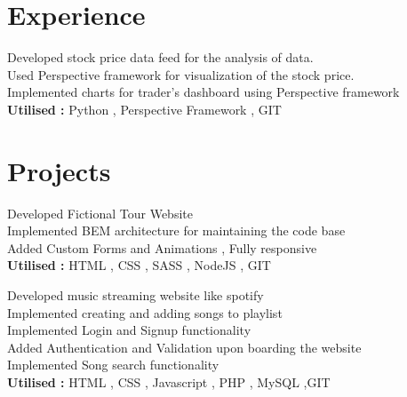 \documentclass[]{deedy-resume-openfont}
\begin{document}
\begin{minipage}[t]{0.66\textwidth} 

\section{Experience}

\textbullet{} Developed stock price data feed for the analysis of data.\\ 
\textbullet Used Perspective framework for visualization of the stock price.\\
\textbullet Implemented charts for trader's dashboard using Perspective framework\\
\textbf{Utilised : } Python , Perspective Framework , GIT 
\sectionsep




\section{Projects}
\textbullet{} Developed Fictional Tour Website  \\
\textbullet{} Implemented BEM architecture for maintaining the code base \\
\textbullet{} Added Custom Forms and Animations , Fully responsive \\
\textbf{Utilised : } HTML , CSS , SASS , NodeJS , GIT
\sectionsep

\textbullet Developed music streaming website like spotify \\
\textbullet Implemented creating and adding songs to playlist\\
\textbullet{} Implemented Login and Signup functionality \\
\textbullet Added Authentication and Validation upon boarding the website \\
\textbullet{} Implemented Song search functionality \\
\textbf{Utilised : } HTML , CSS , Javascript , PHP , MySQL ,GIT
\sectionsep


\end{minipage}
\end{document}
